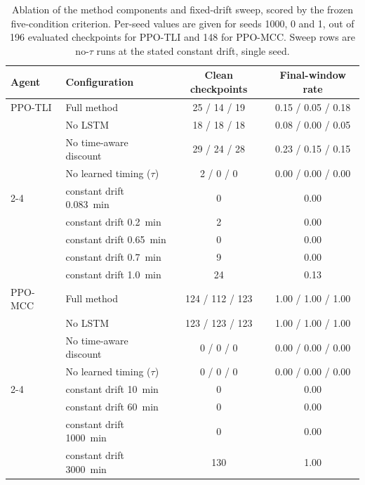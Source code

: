 \begin{table}[hbt!]
\centering
\caption{Ablation of the method components and fixed-drift sweep, scored by the frozen five-condition criterion. Per-seed values are given for seeds 1000, 0 and 1, out of 196 evaluated checkpoints for PPO-TLI and 148 for PPO-MCC. Sweep rows are no-$\tau$ runs at the stated constant drift, single seed.}
\label{tab:ablation}
\footnotesize
\begin{tabular}{llcc}
\toprule
Agent & Configuration & Clean checkpoints & Final-window rate\\
\midrule
PPO-TLI & Full method & \phantom{0}25 / \phantom{0}14 / \phantom{0}19 & 0.15 / 0.05 / 0.18\\
 & No LSTM & \phantom{0}18 / \phantom{0}18 / \phantom{0}18 & 0.08 / 0.00 / 0.05\\
 & No time-aware discount & \phantom{0}29 / \phantom{0}24 / \phantom{0}28 & 0.23 / 0.15 / 0.15\\
 & No learned timing ($\tau$) & \phantom{00}2 / \phantom{00}0 / \phantom{00}0 & 0.00 / 0.00 / 0.00\\
\cmidrule(l){2-4}
 & \quad constant drift 0.083~min & \phantom{00}0 & 0.00\\
 & \quad constant drift 0.2~min & \phantom{00}2 & 0.00\\
 & \quad constant drift 0.65~min & \phantom{00}0 & 0.00\\
 & \quad constant drift 0.7~min & \phantom{00}9 & 0.00\\
 & \quad constant drift 1.0~min & \phantom{0}24 & 0.13\\
\midrule
PPO-MCC & Full method & 124 / 112 / 123 & 1.00 / 1.00 / 1.00\\
 & No LSTM & 123 / 123 / 123 & 1.00 / 1.00 / 1.00\\
 & No time-aware discount & \phantom{00}0 / \phantom{00}0 / \phantom{00}0 & 0.00 / 0.00 / 0.00\\
 & No learned timing ($\tau$) & \phantom{00}0 / \phantom{00}0 / \phantom{00}0 & 0.00 / 0.00 / 0.00\\
\cmidrule(l){2-4}
 & \quad constant drift 10~min & \phantom{00}0 & 0.00\\
 & \quad constant drift 60~min & \phantom{00}0 & 0.00\\
 & \quad constant drift 1000~min & \phantom{00}0 & 0.00\\
 & \quad constant drift 3000~min & 130 & 1.00\\
\bottomrule
\end{tabular}
\end{table}